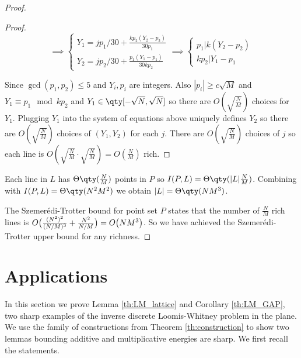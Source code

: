 \documentclass[11pt]{article}
\begin{document}
\begin{proof}
\begin{proof}
\begin{equation*}
    \implies \begin{cases}
    Y_1=jp_1/30+\frac{kp_2(Y_2-p_2)}{30 p_1}\\
    Y_2=jp_2/30+\frac{p_1(Y_1-p_1)}{30 k p_2}
    \end{cases} \implies \begin{cases}
    p_1 | k( Y_2-p_2)\\
    kp_2 | Y_1-p_1
    \end{cases}
\end{equation*}

Since $\gcd(p_1,p_2) \leq 5$ and $Y_i, p_i$ are integers. Also $|p_i| \geq c\sqrt{M}$ and $Y_1 \equiv p_1 \mod{kp_2}$ and $Y_1 \in \qty[-\sqrt{N},\sqrt{N}]$ so there are $O(\sqrt{\frac{N}{M}})$ choices for $Y_1$. Plugging $Y_1$ into the system of equations above uniquely defines $Y_2$ so there are $O(\sqrt{\frac{N}{M}})$ choices of $(Y_1,Y_2)$ for each $j$. There are $O(\sqrt{\frac{N}{M}})$ choices of $j$ so each line is $O(\sqrt{\frac{N}{M}}\cdot\sqrt{\frac{N}{M}})=O(\frac{N}{M})$ rich.

\end{proof}

Each line in $L$ has $\Theta\qty(\frac{N}{M})$ points in $P$ so $I(P,L) = \Theta\qty(|L| \frac{N}{M})$. Combining with $I(P,L)= \Theta\qty(N^2 M^2)$ we obtain $|L| = \Theta\qty( N M^3)$.

The Szemerédi-Trotter bound for point set $P$ states that the number of $\frac{N}{M}$ rich lines is $O\big{(} \frac{(N^2)^2}{(N/M)^3} + \frac{N^2}{N/M} \big{)} = O\big{(} N M^3 \big{)}$. So we have achieved the Szemerédi-Trotter upper bound for any richness.
\end{proof}






\section{Applications} \label{sec:applications}

In this section we prove Lemma \ref{th:LM_lattice} and Corollary \ref{th:LM_GAP}, two sharp examples of the inverse discrete Loomis-Whitney problem in the plane. We use the family of constructions from Theorem \ref{th:construction} to show two lemmas bounding additive and multiplicative energies \cite{MRS13} are sharp.  We first recall the statements.
\vspace{2mm}
\end{document}
